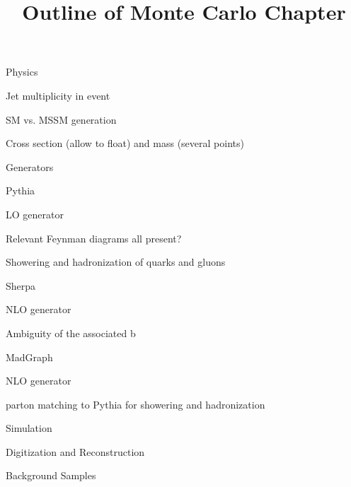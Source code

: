 \documentclass[11pt]{report}
\title{Outline of Monte Carlo Chapter}
\begin{document}
\begin{outline}
	\item Physics
		\begin{outline}
			\item Jet multiplicity in event
			\item SM vs. MSSM generation
			\item Cross section (allow to float) and mass (several points)
		\end{outline}
	\item Generators
		\begin{outline}
			\item Pythia
				\begin{outline}
					\item LO generator
					\item Relevant Feynman diagrams all present?
					\item Showering and hadronization of quarks and gluons
				\end{outline}
			\item Sherpa
				\begin{outline}
					\item NLO generator
					\item Ambiguity of the associated b
				\end{outline}
			\item MadGraph
				\begin{outline}
					\item NLO generator
					\item parton matching to Pythia for showering and hadronization
				\end{outline}
		\end{outline}
	\item Simulation
	\item Digitization and Reconstruction
	\item Background Samples

\end{outline}
\end{document}

